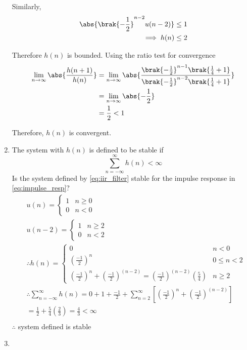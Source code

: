 \documentclass[journal,12pt,twocolumn]{IEEEtran}
\renewcommand\thesection{\arabic{section}}
\begin{document}
\begin{enumerate}[label=\thesection.\arabic*]
	Similarly,
	\begin{align}
		\abs{\brak{-\frac12}^{n-2} u(n-2)} &\le 1 \\
		\implies h(n) &\le 2
	\end{align}
	
	Therefore $h(n)$ is bounded.
	Using the ratio test for convergence
	\begin{align}
		\lim_{n \to \infty} \abs{\frac{h(n+1)}{h(n)}} &= \lim_{n \to \infty} \abs{\frac{\brak{-\frac12}^{n-1} \brak{\frac14 + 1}}{\brak{-\frac12}^{n-2} \brak{\frac14 + 1}}} \\
		&= \lim_{n \to \infty} \abs{-\frac12} \\
		&= \frac{1}{2} < 1
	\end{align}
	
	Therefore, $h(n)$ is convergent.
%
\item The system with $h(n)$ is defined to be stable if
\begin{equation}
\sum_{n=-\infty}^{\infty}h(n) < \infty
\end{equation}
Is the system defined by \eqref{eq:iir_filter} stable for the impulse response in \eqref{eq:impulse_resp}?\\
\solution
\begin{align}
&u(n)=\begin{cases}
1 & n\geq 0\\
0 & n<0
\end{cases}\\
&u(n-2)=\begin{cases}
1 & n\geq 2\\
0 & n<2
\end{cases}\\
&\therefore h(n)=\begin{cases}
0 & n<0\\
\left(\frac{-1}{2}\right)^n & 0 \leq n<2\\
\left(\frac{-1}{2}\right)^n +\left(\frac{-1}{2}\right)^{(n-2)} ={\left(\frac{-1}{2}\right)}^{(n-2)}\left(\frac{5}{4}\right)& n \geq 2
\end{cases}\\
&\therefore \sum_{n=-\infty}^{\infty}h(n)=0+1+\frac{-1}{2}+\sum_{n=2}^{\infty}\left[\left(\frac{-1}{2}\right)^n +\left(\frac{-1}{2}\right)^{(n-2)}\right]\\
&=\frac{1}{2}+\frac{5}{4}\left(\frac{2}{3}\right)=\frac{4}{3}<\infty\\
\end{align}
$\therefore$ system defined is stable
%
\item 

\end{enumerate}
\end{document}
